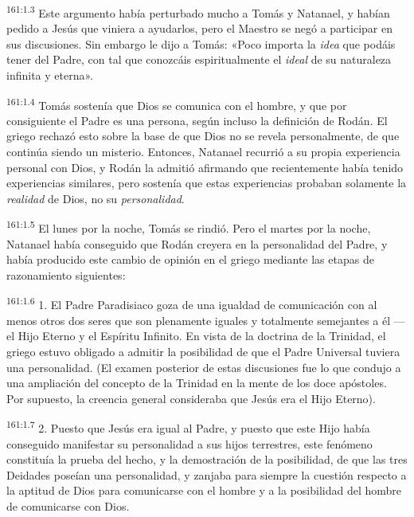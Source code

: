 \par
\textsuperscript{161:1.3} Este argumento había perturbado mucho a Tomás y Natanael, y habían pedido a Jesús que viniera a ayudarlos, pero el Maestro se negó a participar en sus discusiones. Sin embargo le dijo a Tomás: «Poco importa la \textit{idea} que podáis tener del Padre, con tal que conozcáis espiritualmente el \textit{ideal} de su naturaleza infinita y eterna».

\par
\textsuperscript{161:1.4} Tomás sostenía que Dios se comunica con el hombre, y que por consiguiente el Padre es una persona, según incluso la definición de Rodán. El griego rechazó esto sobre la base de que Dios no se revela personalmente, de que continúa siendo un misterio. Entonces, Natanael recurrió a su propia experiencia personal con Dios, y Rodán la admitió afirmando que recientemente había tenido experiencias similares, pero sostenía que estas experiencias probaban solamente la \textit{realidad} de Dios, no su \textit{personalidad}.

\par
\textsuperscript{161:1.5} El lunes por la noche, Tomás se rindió. Pero el martes por la noche, Natanael había conseguido que Rodán creyera en la personalidad del Padre, y había producido este cambio de opinión en el griego mediante las etapas de razonamiento siguientes:

\par
\textsuperscript{161:1.6} 1. El Padre Paradisiaco goza de una igualdad de comunicación con al menos otros dos seres que son plenamente iguales y totalmente semejantes a él ---el Hijo Eterno y el Espíritu Infinito. En vista de la doctrina de la Trinidad, el griego estuvo obligado a admitir la posibilidad de que el Padre Universal tuviera una personalidad. (El examen posterior de estas discusiones fue lo que condujo a una ampliación del concepto de la Trinidad en la mente de los doce apóstoles. Por supuesto, la creencia general consideraba que Jesús era el Hijo Eterno).

\par
\textsuperscript{161:1.7} 2. Puesto que Jesús era igual al Padre, y puesto que este Hijo había conseguido manifestar su personalidad a sus hijos terrestres, este fenómeno constituía la prueba del hecho, y la demostración de la posibilidad, de que las tres Deidades poseían una personalidad, y zanjaba para siempre la cuestión respecto a la aptitud de Dios para comunicarse con el hombre y a la posibilidad del hombre de comunicarse con Dios.

